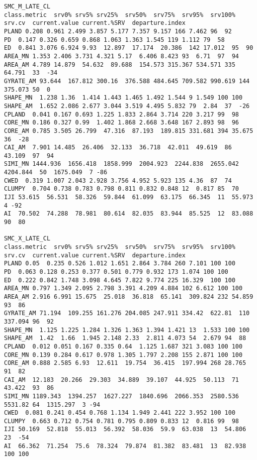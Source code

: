 \begin{verbatim}
SMC_M_LATE_CL                     
class.metric  srv0% srv5% srv25%  srv50%  srv75%  srv95%  srv100% srv.cv  current.value current.%SRV  departure.index
PLAND 0.208 0.961 2.499 3.857 5.177 7.357 9.157 166 7.462 96  92
PD  0.147 0.326 0.659 0.868 1.063 1.363 1.545 119 1.112 79  58
ED  0.841 3.076 6.924 9.93  12.897  17.174  20.386  142 17.012  95  90
AREA_MN 1.353 2.406 3.731 4.321 5.17  6.406 8.423 93  6.71  97  94
AREA_AM 4.789 14.879  54.632  89.688  154.573 315.367 534.571 335 64.791  33  -34
GYRATE_AM 93.644  167.812 300.16  376.588 484.645 709.582 990.619 144 375.073 50  0
SHAPE_MN  1.238 1.36  1.414 1.443 1.465 1.492 1.544 9 1.549 100 100
SHAPE_AM  1.652 2.086 2.677 3.044 3.519 4.495 5.832 79  2.84  37  -26
CPLAND  0.041 0.167 0.693 1.225 1.833 2.864 3.714 220 3.217 99  98
CORE_MN 0.186 0.327 0.99  1.402 1.868 2.668 3.648 167 2.893 98  96
CORE_AM 0.785 3.505 26.799  47.316  87.193  189.815 331.681 394 35.675  36  -28
CAI_AM  7.901 14.485  26.406  32.133  36.718  42.011  49.619  86  43.109  97  94
SIMI_MN 1444.936  1656.418  1858.999  2004.923  2244.838  2655.042  4204.844  50  1675.049  7 -86
CWED  0.319 1.007 2.043 2.928 3.756 4.952 5.923 135 4.36  87  74
CLUMPY  0.704 0.738 0.783 0.798 0.811 0.832 0.848 12  0.817 85  70
IJI 53.615  56.531  58.326  59.844  61.099  63.175  66.345  11  55.973  4 -92
AI  70.502  74.288  78.981  80.614  82.035  83.944  85.525  12  83.088  90  80

SMC_X_LATE_CL                     
class.metric  srv0% srv5% srv25%  srv50%  srv75%  srv95%  srv100% srv.cv  current.value current.%SRV  departure.index
PLAND 0.05  0.235 0.526 1.012 1.651 2.864 3.784 260 7.101 100 100
PD  0.063 0.128 0.253 0.377 0.501 0.779 0.932 173 1.074 100 100
ED  0.222 0.842 1.748 3.098 4.645 7.822 9.774 225 16.329  100 100
AREA_MN 0.797 1.349 2.095 2.798 3.391 4.209 4.884 102 6.612 100 100
AREA_AM 2.916 6.991 15.675  25.018  36.818  65.141  309.824 232 54.859  93  86
GYRATE_AM 71.194  109.255 161.276 204.085 247.911 334.42  622.81  110 337.094 96  92
SHAPE_MN  1.125 1.225 1.284 1.326 1.363 1.394 1.421 13  1.533 100 100
SHAPE_AM  1.42  1.66  1.945 2.148 2.33  2.811 4.073 54  2.679 94  88
CPLAND  0.012 0.051 0.167 0.335 0.64  1.125 1.687 321 3.083 100 100
CORE_MN 0.139 0.284 0.617 0.978 1.305 1.797 2.208 155 2.871 100 100
CORE_AM 0.888 2.585 6.93  12.611  19.754  36.415  197.994 268 28.765  91  82
CAI_AM  12.183  20.266  29.303  34.889  39.107  44.925  50.113  71  43.422  93  86
SIMI_MN 1189.343  1394.257  1627.227  1840.696  2066.353  2580.536  5531.82 64  1315.297  3 -94
CWED  0.081 0.241 0.454 0.768 1.134 1.949 2.441 222 3.952 100 100
CLUMPY  0.663 0.712 0.754 0.781 0.795 0.809 0.833 12  0.816 99  98
IJI 50.169  52.818  55.013  56.392  58.036  59.9  63.038  13  54.806  23  -54
AI  66.362  71.254  75.6  78.324  79.874  81.382  83.481  13  82.938  100 100
\end{verbatim}

